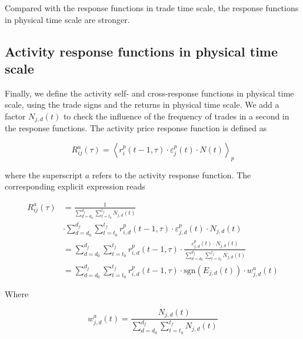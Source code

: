 Compared with the response functions in trade time scale, the response functions
in physical time scale are stronger.

\subsection{Activity response functions in physical time scale}
\label{subsec:activity_response_function}

Finally, we define the activity self- and cross-response functions in physical
time scale, using the trade signs and the returns in physical time scale.
We add a factor $N_{j,d} \left(t \right)$ to check the influence of the
frequency of trades in a second in the response functions. The activity price
response function is defined as

\begin{equation}\label{eq:activity_response_functions_general}
    R^{a}_{ij}\left(\tau\right)=\left\langle r^{p}_{i}\left(t-1, \tau\right)
    \cdot\varepsilon_{j}^{p} \left(t\right) \cdot N \left(t \right)
    \right\rangle _{p}
\end{equation}

where the superscript $a$ refers to the activity response function. The
corresponding explicit expression reads

\begin{align}
    R_{ij}^{a}\left(\tau\right)&=\frac{1}{\sum_{d=d_{0}}^{d_{f}}
    \sum_{t=t_{0}}^{t_{f}}N_{j,d} \left(t\right)} \nonumber \\
    &\cdot\sum_{d=d_{0}}^{d_{f}}\sum_{t=t_{0}}^{t_{f}}r^{p}_{i,d}
    \left(t-1,\tau\right) \cdot\varepsilon_{j,d}^{p}\left(t\right)\cdot N_{j,d}
    \left(t\right)\\
    &=\sum_{d=d_{0}}^{d_{f}} \sum_{t=t_{0}}^{t_{f}}r^{p}_{i,d}
    \left(t-1,\tau\right) \cdot\frac{\varepsilon_{j,d}^{p}\left(t \right)
    \cdot N_{j,d}\left(t\right)} {\sum_{d=d_{0}}^{d_{f}}\sum_{t=t_{0}}^{t_{f}}
    N_{j,d}\left(t \right)} \nonumber \\
    &=\sum_{d=d_{0}}^{d_{f}} \sum_{t=t_{0}}^{t_{f}}r^{p}_{i,d}
    \left(t-1,\tau\right) \cdot\text{sgn}\left(E_{j,d}\left(t\right)\right)
    \cdot w_{j,d}^{a}\left(t\right)
\end{align}

Where

\begin{equation}
    w_{j,d}^{a}\left(t\right) = \frac{N_{j,d}\left(t \right)}
    {\sum_{d=d_{0}}^{d_{f}}\sum_{t=t_{0}}^{t_{f}}N_{j,d}\left(t\right)}
\end{equation}

